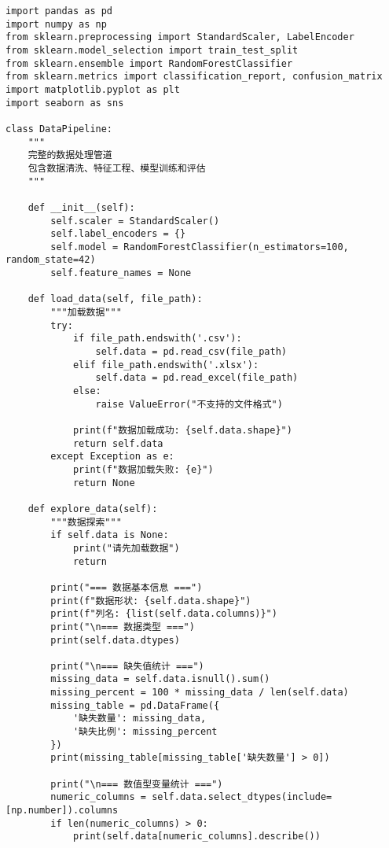 \begin{codebox}[title=数据处理管道实现]
\begin{verbatim}
import pandas as pd
import numpy as np
from sklearn.preprocessing import StandardScaler, LabelEncoder
from sklearn.model_selection import train_test_split
from sklearn.ensemble import RandomForestClassifier
from sklearn.metrics import classification_report, confusion_matrix
import matplotlib.pyplot as plt
import seaborn as sns

class DataPipeline:
    """
    完整的数据处理管道
    包含数据清洗、特征工程、模型训练和评估
    """
    
    def __init__(self):
        self.scaler = StandardScaler()
        self.label_encoders = {}
        self.model = RandomForestClassifier(n_estimators=100, random_state=42)
        self.feature_names = None
        
    def load_data(self, file_path):
        """加载数据"""
        try:
            if file_path.endswith('.csv'):
                self.data = pd.read_csv(file_path)
            elif file_path.endswith('.xlsx'):
                self.data = pd.read_excel(file_path)
            else:
                raise ValueError("不支持的文件格式")
            
            print(f"数据加载成功: {self.data.shape}")
            return self.data
        except Exception as e:
            print(f"数据加载失败: {e}")
            return None
    
    def explore_data(self):
        """数据探索"""
        if self.data is None:
            print("请先加载数据")
            return
        
        print("=== 数据基本信息 ===")
        print(f"数据形状: {self.data.shape}")
        print(f"列名: {list(self.data.columns)}")
        print("\n=== 数据类型 ===")
        print(self.data.dtypes)
        
        print("\n=== 缺失值统计 ===")
        missing_data = self.data.isnull().sum()
        missing_percent = 100 * missing_data / len(self.data)
        missing_table = pd.DataFrame({
            '缺失数量': missing_data,
            '缺失比例': missing_percent
        })
        print(missing_table[missing_table['缺失数量'] > 0])
        
        print("\n=== 数值型变量统计 ===")
        numeric_columns = self.data.select_dtypes(include=[np.number]).columns
        if len(numeric_columns) > 0:
            print(self.data[numeric_columns].describe())
        

\end{verbatim}
\end{codebox}
